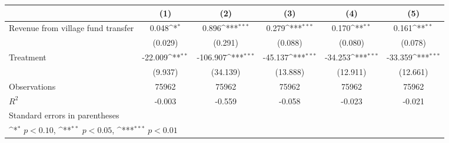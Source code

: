 {
\def\sym#1{\ifmmode^{#1}\else\(^{#1}\)\fi}
\begin{tabular}{l*{5}{c}}
\toprule
                    &\multicolumn{1}{c}{(1)}         &\multicolumn{1}{c}{(2)}         &\multicolumn{1}{c}{(3)}         &\multicolumn{1}{c}{(4)}         &\multicolumn{1}{c}{(5)}         \\
\midrule
Revenue from village fund transfer&       0.048\sym{*}  &       0.896\sym{***}&       0.279\sym{***}&       0.170\sym{**} &       0.161\sym{**} \\
                    &     (0.029)         &     (0.291)         &     (0.088)         &     (0.080)         &     (0.078)         \\
\addlinespace
Treatment           &     -22.009\sym{**} &    -106.907\sym{***}&     -45.137\sym{***}&     -34.253\sym{***}&     -33.359\sym{***}\\
                    &     (9.937)         &    (34.139)         &    (13.888)         &    (12.911)         &    (12.661)         \\
\midrule
Observations        &       75962         &       75962         &       75962         &       75962         &       75962         \\
\(R^{2}\)           &      -0.003         &      -0.559         &      -0.058         &      -0.023         &      -0.021         \\
\bottomrule
\multicolumn{6}{l}{\footnotesize Standard errors in parentheses}\\
\multicolumn{6}{l}{\footnotesize \sym{*} \(p<0.10\), \sym{**} \(p<0.05\), \sym{***} \(p<0.01\)}\\
\end{tabular}
}
